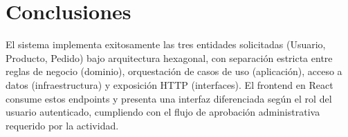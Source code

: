 \documentclass[11pt,a4paper]{article}
\begin{document}
\section{Conclusiones}
 
El sistema implementa exitosamente las tres entidades solicitadas (Usuario, Producto, Pedido) bajo arquitectura hexagonal, con separación estricta entre reglas de negocio (dominio), orquestación de casos de uso (aplicación), acceso a datos (infraestructura) y exposición HTTP (interfaces). El frontend en React consume estos endpoints y presenta una interfaz diferenciada según el rol del usuario autenticado, cumpliendo con el flujo de aprobación administrativa requerido por la actividad.
 
\end{document}
